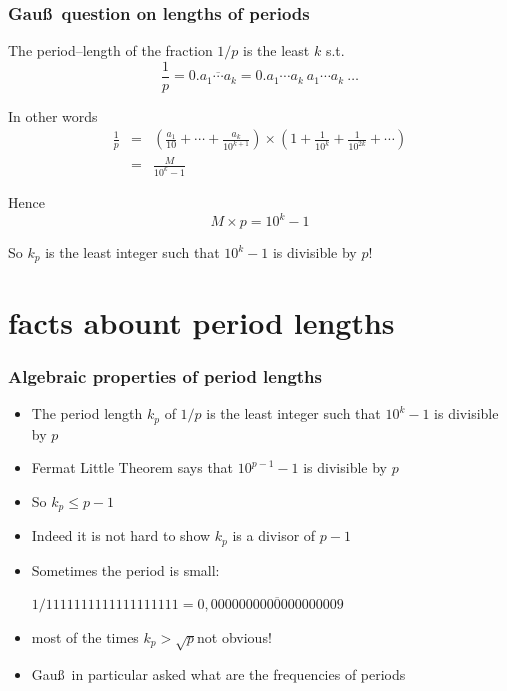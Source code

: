 \documentclass[10pt,handout]{beamer} %
\begin{document}
\begin{frame}\frametitle{Gau\ss\ question on lengths of periods} \pause

The period--length of the fraction $1/p$ is the least $k$ s.t. 
$$\frac1p=0.\overline{a_1\cdots a_k}=0.a_1\cdots a_k\ a_1\cdots a_k\ \ldots$$\pause

In other words
\begin{eqnarray*}
\frac1p&=&\left(\frac{a_1}{10}+\cdots+\frac{a_k}{10^{k+1}}\right)\times\left(1+\frac1{10^k}+\frac1{10^{2k}}+\cdots\right)\\
  &=&\frac{M}{10^k-1}
\end{eqnarray*}\pause

Hence $$M\times p=10^k-1$$\pause

{\alert{So $k_p$ is the least integer such that $10^k-1$ is divisible by $p$!}}
\end{frame}

	\section{facts abount period lengths}

\begin{frame}
 \frametitle{Algebraic properties of period lengths}
\begin{itemize}[<+-|alert@+>]
 \item The period length $k_p$ of $1/p$  is the least integer such that $10^k-1$ is divisible by $p$
\item Fermat Little Theorem says that $10^{p-1}-1$ is divisible by $p$
\item So $k_p\le p-1$ 
\item Indeed it is not hard to show $k_p$  is a divisor of $p-1$
\item Sometimes the period is small:
\centerline{\scriptsize{ $1/1111111111111111111=0,\overline{0000000000000000009}$}}
\item  most of the times $k_p>\sqrt{p}$\qquad not obvious!
\item Gau\ss\ in particular asked what are the frequencies of periods
\end{itemize}
\end{frame}
\end{document}
